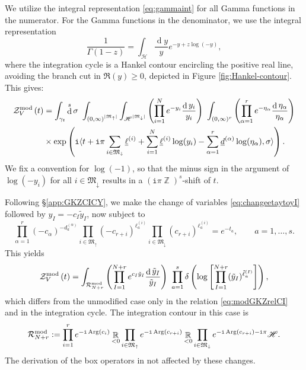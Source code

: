 \documentclass[12pt,a4paper,oneside]{amsart}
\numberwithin{equation}{section}
\theoremstyle{definition}
\theoremstyle{remark}
\DeclareMathOperator{\R}{\mathbb{R}}
\DeclareMathOperator{\Z}{\mathbb{Z}}
\DeclareMathOperator{\dd}{d}
\DeclareMathOperator{\Arg}{Arg}
\newcommand{\mz}{\mathcal{Z}}
\newcommand{\ii}{\mathtt{i}}
\begin{document}
\begin{appendix}
We utilize the integral representation \eqref{eq:gammaint} for all Gamma functions in the numerator. For the Gamma functions in the denominator, we use the integral representation 
\begin{equation}
\label{eq:invgamma}
    \frac{1}{\Gamma (1-z)} = \int_{\mathscr{H}} \frac{\dd y}{y} e^{-y + z \log (-y)} ,
\end{equation}
where the integration cycle is a Hankel contour encircling the positive real line, avoiding the branch cut in $\Re (y) \ge 0$, depicted in Figure \ref{fig:Hankel-contour}. This gives:
\begin{equation*}
\begin{aligned}
	\mz_{V}^{\text{\rm mod}} \left( t \right)  &= \int_{\gamma_t} \dd^s \sigma~ \int_{(0,\infty)^{\lvert \mathfrak{M}_{\uparrow}\rvert } }\int_{\mathscr{H}^{\lvert \mathfrak{M}_{\downarrow}\rvert } } \left( \prod_{i=1}^{N} e^{-y_i}  \frac{\dd y_i}{y_i} \right)~ \int_{(0,\infty)^{r}} \left( \prod_{\alpha=1}^{r} e^{-\eta_{\alpha}}  \frac{\dd \eta_{\alpha}}{\eta_{\alpha}} \right) \\
	& \times \exp \left( \ii \langle t + \ii \pi \sum_{i\in \mathfrak{M}_{\downarrow}} \underline{\ell}^{(i)} + \sum_{i=1}^{N} \underline{\ell}^{(i)} \log (y_i) - \sum_{\alpha=1}^{r} \underline{d}^{(\alpha)} \log (\eta_{\alpha}) , \sigma\rangle  \right) .
\end{aligned}
\end{equation*}
We fix a convention for $\log (-1)$, so that the minus sign in the argument of $\log (-y_i)$ for all $i\in \mathfrak{M}_{\downarrow}$ results in a $(\ii \pi \Z)^s$-shift of $t$.\par
Following \S\ref{app:GKZCICY}, we make the change of variables \eqref{eq:changeetaytoyI} followed by $y_I=-c_I \tilde{y}_I$, now subject to 
\begin{equation}
\label{eq:modGKZrelCI}
    \prod_{\alpha=1}^{r} \left( - c_{\alpha} \right)^{-d_a ^{(\alpha)}} \prod_{i \in \mathfrak{M}_{\uparrow} } \left( - c_{r+i} \right)^{\ell_a ^{(i)}} \prod_{i \in \mathfrak{M}_{\downarrow} } \left( c_{r+i} \right)^{\ell_a ^{(i)}} = e^{-t_a  } , \qquad  a=1, \dots, s .
\end{equation}
This yields 
\begin{equation*}
	\mz_{V}^{\text{\rm mod}} \left( t \right)  = \int_{\mathcal{R}^{\text{\rm mod}}_{N+r}} \left( \prod_{I=1}^{N+r} e^{c_I\tilde{y}_I}  \frac{\dd \tilde{y}_I}{\tilde{y}_I} \right) ~ \prod_{a=1}^{s} \delta \left( \log  \left[ \prod_{I=1}^{N+r} (\tilde{y}_I)^{\tilde{\ell}_a^{(I)}} \right] \right) ,
\end{equation*}
which differs from the unmodified case only in the relation \eqref{eq:modGKZrelCI} and in the integration cycle. The integration contour in this case is 
\begin{equation*}
	\mathcal{R}^{\text{\rm mod}}_{N+r} := \prod_{i=1}^{r} e^{- \ii \Arg (c_i)} \R_{< 0} \prod_{i \in \mathfrak{M}_{\uparrow}} e^{- \ii \Arg (c_{r+i})} \R_{< 0} \prod_{i \in \mathfrak{M}_{\downarrow}} e^{- \ii \Arg (c_{r+i}) - \ii \pi} \mathscr{H}.
\end{equation*}
The derivation of the box operators in not affected by these changes.



\end{appendix}
\end{document}
